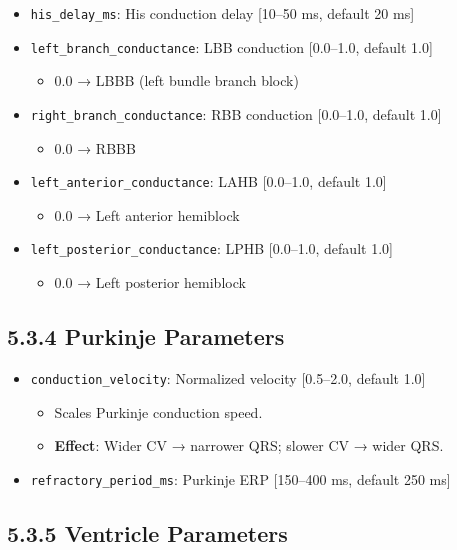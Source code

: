\documentclass[12pt,oneside,a4paper]{book}
\newcommand{\code}[1]{\texttt{#1}}
\begin{document}
\begin{itemize}
  \item \code{his\_delay\_ms}: His conduction delay [10--50 ms, default 20 ms]
  \item \code{left\_branch\_conductance}: LBB conduction [0.0--1.0, default 1.0]
    \begin{itemize}
      \item $0.0$ → LBBB (left bundle branch block)
    \end{itemize}
  \item \code{right\_branch\_conductance}: RBB conduction [0.0--1.0, default 1.0]
    \begin{itemize}
      \item $0.0$ → RBBB
    \end{itemize}
  \item \code{left\_anterior\_conductance}: LAHB [0.0--1.0, default 1.0]
    \begin{itemize}
      \item $0.0$ → Left anterior hemiblock
    \end{itemize}
  \item \code{left\_posterior\_conductance}: LPHB [0.0--1.0, default 1.0]
    \begin{itemize}
      \item $0.0$ → Left posterior hemiblock
    \end{itemize}
\end{itemize}

\subsection{5.3.4 Purkinje Parameters}

\begin{itemize}
  \item \code{conduction\_velocity}: Normalized velocity [0.5--2.0, default 1.0]
    \begin{itemize}
      \item Scales Purkinje conduction speed.
      \item \textbf{Effect}: Wider CV → narrower QRS; slower CV → wider QRS.
    \end{itemize}
  \item \code{refractory\_period\_ms}: Purkinje ERP [150--400 ms, default 250 ms]
\end{itemize}

\subsection{5.3.5 Ventricle Parameters}
\end{document}
